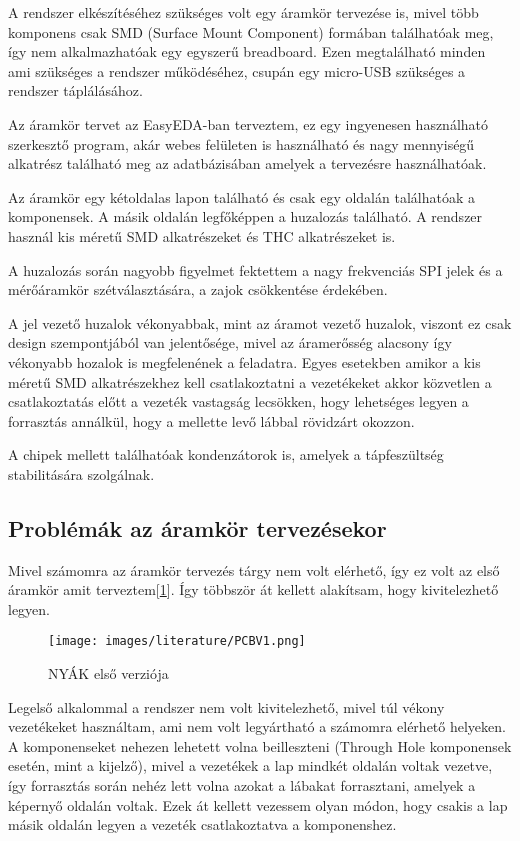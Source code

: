 A rendszer elkészítéséhez szükséges volt egy áramkör tervezése is, mivel több komponens
csak SMD (Surface Mount Component) formában találhatóak meg, így nem alkalmazhatóak egy
egyszerű breadboard. Ezen megtalálható minden ami szükséges a rendszer működéséhez, 
csupán egy micro-USB szükséges a rendszer táplálásához.

Az áramkör tervet az EasyEDA-ban terveztem, ez egy ingyenesen használható szerkesztő
program, akár webes felületen is használható és nagy mennyiségű alkatrész található
meg az adatbázisában amelyek a tervezésre használhatóak.

Az áramkör egy kétoldalas lapon található és csak egy oldalán találhatóak a komponensek.
A másik oldalán legfőképpen a huzalozás található. A rendszer használ kis méretű
SMD alkatrészeket és THC alkatrészeket is. 

A huzalozás során nagyobb figyelmet fektettem a nagy frekvenciás SPI jelek
és a mérőáramkör szétválasztására, a zajok csökkentése érdekében.

A jel vezető huzalok vékonyabbak, mint az áramot vezető huzalok, viszont ez csak
design szempontjából van jelentősége, mivel az áramerősség alacsony így vékonyabb
hozalok is megfelenének a feladatra. Egyes esetekben amikor a kis méretű SMD 
alkatrészekhez kell csatlakoztatni a vezetékeket akkor közvetlen a csatlakoztatás
előtt a vezeték vastagság lecsökken, hogy lehetséges legyen a forrasztás annálkül,
hogy a mellette levő lábbal rövidzárt okozzon.

A chipek mellett találhatóak kondenzátorok is, amelyek a tápfeszültség stabilitására
szolgálnak.

\subsection{Problémák az áramkör tervezésekor}

Mivel számomra az áramkör tervezés tárgy nem volt elérhető, így ez volt az első 
áramkör amit terveztem[\ref{fig:PCBV1}]. Így többször át kellett alakítsam, hogy kivitelezhető legyen.

\begin{figure}[h]
    \centering
    \texttt{[image: images/literature/PCBV1.png]}
    \caption{NYÁK első verziója}
    \label{fig:PCBV1}
\end{figure}

Legelső alkalommal a rendszer nem volt kivitelezhető, mivel túl vékony vezetékeket
használtam, ami nem volt legyártható a számomra elérhető helyeken. A komponenseket 
nehezen lehetett volna beilleszteni (Through Hole komponensek esetén, mint a kijelző),
mivel a vezetékek a lap mindkét oldalán voltak vezetve, így forrasztás során nehéz
lett volna azokat a lábakat forrasztani, amelyek a képernyő oldalán voltak.
Ezek át kellett vezessem olyan módon, hogy csakis a lap másik oldalán legyen a vezeték
csatlakoztatva a komponenshez.

